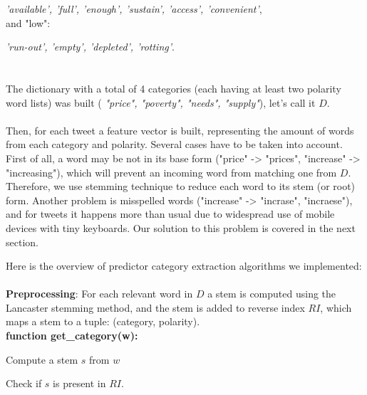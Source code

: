 \documentclass[12pt]{report}
\begin{document}
\emph{'available', 'full', 'enough', 'sustain', 'access', 'convenient'},
\\
and "low":

\emph{'run-out', 'empty', 'depleted', 'rotting'}.
\\ \\ \\
The dictionary with a total of 4 categories (each having at least two polarity word lists) was built (\emph{ "price", "poverty", "needs", "supply"}), let's call it $D$.
\\ \\
Then, for each tweet a feature vector is built, representing the amount of words from each category and polarity. Several cases have to be taken into account. First of all, a word may be not in its base form ("price" -> "prices", "increase" -> "increasing"), which will prevent an incoming word from matching one from $D$. Therefore, we use stemming technique to reduce each word to its stem (or root) form. Another problem is misspelled words ("increase" -> "incrase", "incraese"), and for tweets it happens more than usual due to widespread use of mobile devices with tiny keyboards. Our solution to this problem is covered in the next section.

Here is the overview of predictor category extraction algorithms we implemented:\\ \\
\textbf{Preprocessing}: For each relevant word in $D$ a stem is computed using the Lancaster stemming method, and the stem is added to reverse index $RI$, which maps a stem to a tuple: (category, polarity). \\

\textbf{function get\_category(w):}

\indent
\begin{algorithm}[H]
Compute a stem $s$ from $w$ \par
Check if $s$ is present in $RI$.

\end{algorithm}
\noindent \\
\end{document}
